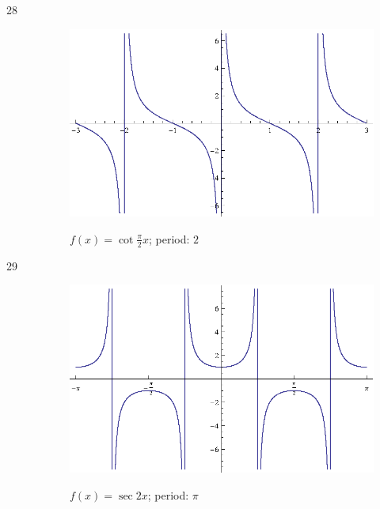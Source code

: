 \documentclass{exam}
\begin{document}
\begin{description}
      \item[28]
        \begin{figure}[H]
          \centering
          \includegraphics[scale=0.9]{exercise28.eps}

          $f(x) = \cot \frac{\pi}{2} x $; period: $2$
        \end{figure}

      \item[29]
        \begin{figure}[H]
          \centering
          \includegraphics[scale=0.9]{exercise29.eps}

          $f(x) = \sec 2x $; period: $\pi$
        \end{figure}


\end{description}
\end{document}
